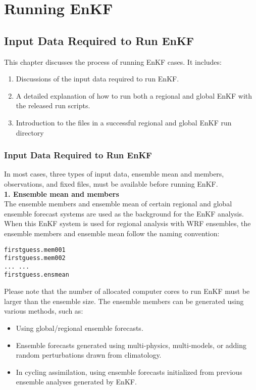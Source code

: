 \chapter{Running EnKF}\label{enkf_run}
\setlength{\parskip}{12pt}

\section{Input Data Required to Run EnKF}

This chapter discusses the process of running EnKF cases. It includes:
\begin{enumerate}
\item Discussions of the input data required to run EnKF.
\item A detailed explanation of how to run both a regional and global EnKF with the released run scripts. 
\item Introduction to the files in a successful regional and global EnKF run directory
\end{enumerate}

\subsection{Input Data Required to Run EnKF}

In most cases, three types of input data, ensemble mean and members, observations, 
and fixed files, must be available before running EnKF.\\

\textbf{1. Ensemble mean and members} \\
The ensemble members and ensemble mean of certain regional and global ensemble 
forecast systems are used as the background for the EnKF analysis. When this EnKF 
system is used for regional analysis with WRF ensembles, the ensemble members 
and ensemble mean follow the naming convention:
\begin{verbatim}
firstguess.mem001 
firstguess.mem002
... ...
firstguess.ensmean
\end{verbatim}

Please note that the number of allocated computer cores to run EnKF must be larger than the ensemble size. 
The ensemble members can be generated using various methods, such as:
\begin{itemize}
\item Using global/regional ensemble forecasts.
\item Ensemble forecasts generated using multi-physics, multi-models, or adding
random perturbations drawn from climatology.
\item In cycling assimilation, using ensemble forecasts initialized from previous ensemble analyses generated by EnKF. 
\end{itemize}

